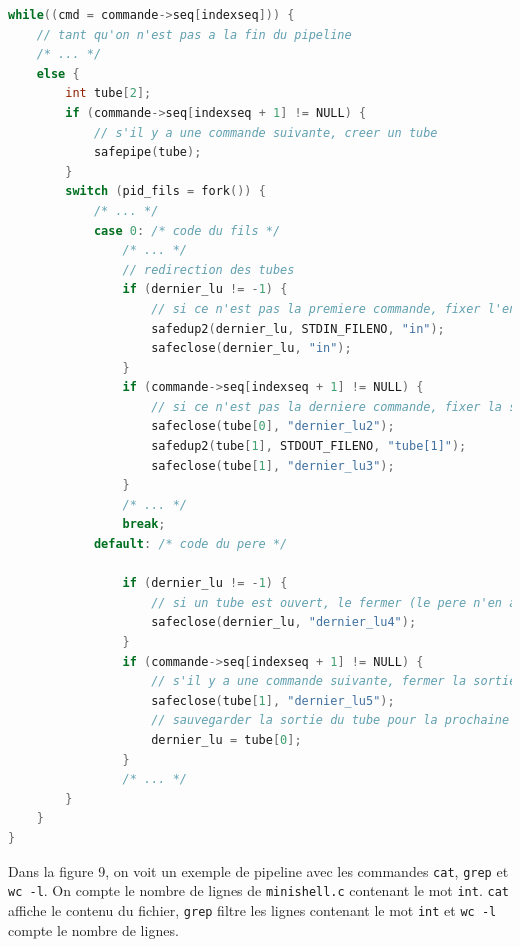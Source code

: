 \documentclass{article}
\begin{document}
\begin{lstlisting}[language=C, caption=gestion des pipelines]
while((cmd = commande->seq[indexseq])) {
    // tant qu'on n'est pas a la fin du pipeline
    /* ... */
    else {
        int tube[2];
        if (commande->seq[indexseq + 1] != NULL) {
            // s'il y a une commande suivante, creer un tube
            safepipe(tube);
        }
        switch (pid_fils = fork()) {
            /* ... */
            case 0: /* code du fils */
                /* ... */
                // redirection des tubes
                if (dernier_lu != -1) {
                    // si ce n'est pas la premiere commande, fixer l'entree standard a la sortie du tube precedent et fermer la sortie du tube
                    safedup2(dernier_lu, STDIN_FILENO, "in");
                    safeclose(dernier_lu, "in");
                }
                if (commande->seq[indexseq + 1] != NULL) {
                    // si ce n'est pas la derniere commande, fixer la sortie standard a l'entree du tube et fermer l'entree du tube
                    safeclose(tube[0], "dernier_lu2");
                    safedup2(tube[1], STDOUT_FILENO, "tube[1]");
                    safeclose(tube[1], "dernier_lu3");
                }
                /* ... */
                break;
            default: /* code du pere */

                if (dernier_lu != -1) {
                    // si un tube est ouvert, le fermer (le pere n'en a pas besoin)
                    safeclose(dernier_lu, "dernier_lu4");
                }
                if (commande->seq[indexseq + 1] != NULL) {
                    // s'il y a une commande suivante, fermer la sortie (pas besoin dans le pere)
                    safeclose(tube[1], "dernier_lu5");
                    // sauvegarder la sortie du tube pour la prochaine commande
                    dernier_lu = tube[0];
                }
                /* ... */
        }
    }
}
\end{lstlisting}

Dans la figure 9, on voit un exemple de pipeline avec les commandes \texttt{cat}, \texttt{grep} et \texttt{wc -l}. On compte le nombre de lignes de \texttt{minishell.c} contenant le mot \texttt{int}. \texttt{cat} affiche le contenu du fichier, \texttt{grep} filtre les lignes contenant le mot \texttt{int} et \texttt{wc -l} compte le nombre de lignes.
\end{document}
